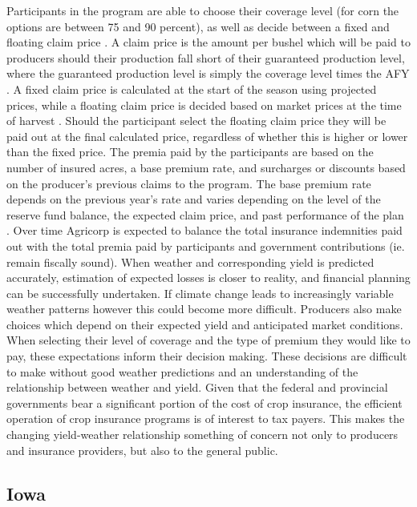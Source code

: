 Participants in the program are able to choose their coverage level (for corn the options are between 75 and 90 percent), as well as decide between a fixed and floating claim price \citep{Agri2014}. A claim price is the amount per bushel which will be paid to producers should their production fall short of their guaranteed production level, where the guaranteed production level is simply the coverage level times the AFY \citep{Agri2013}. A fixed claim price is calculated at the start of the season using projected prices, while a floating claim price is decided based on market prices at the time of harvest \citep{Agri2013}. Should the participant select the floating claim price they will be paid out at the final calculated price, regardless of whether this is higher or lower than the fixed price. The premia paid by the participants are based on the number of insured acres, a base premium rate, and surcharges or discounts based on the producer's previous claims to the program. The base premium rate depends on the previous year's rate and varies depending on the level of the reserve fund balance, the expected claim price, and past performance of the plan \citep{Agri2014}. Over time Agricorp is expected to balance the total insurance indemnities paid out with the total premia paid by participants and government contributions (ie. remain fiscally sound).  When weather and corresponding yield is predicted accurately, estimation of expected losses is closer to reality, and financial planning can be successfully undertaken. If climate change leads to increasingly variable weather patterns however this could become more difficult. Producers also make choices which depend on their expected yield and anticipated market conditions. When selecting their level of coverage and the type of premium they would like to pay, these expectations inform their decision making. These decisions are difficult to make without good weather predictions and an understanding of the relationship between weather and yield. Given that the federal and provincial governments bear a significant portion of the cost of crop insurance, the efficient operation of crop insurance programs is of interest to tax payers. This makes the changing yield-weather relationship something of concern not only to producers and insurance providers, but also to the general public.

\subsection{Iowa}


